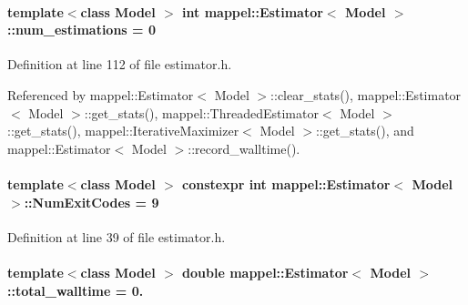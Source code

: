 \paragraph[{\texorpdfstring{num\+\_\+estimations}{num_estimations}}]{\setlength{\rightskip}{0pt plus 5cm}template$<$class Model $>$ int {\bf mappel\+::\+Estimator}$<$ Model $>$\+::num\+\_\+estimations = 0\hspace{0.3cm}{\ttfamily [protected]}}\hypertarget{classmappel_1_1Estimator_ab15b88435d6c50a68fac84465d950b12}{}\label{classmappel_1_1Estimator_ab15b88435d6c50a68fac84465d950b12}


Definition at line 112 of file estimator.\+h.



Referenced by mappel\+::\+Estimator$<$ Model $>$\+::clear\+\_\+stats(), mappel\+::\+Estimator$<$ Model $>$\+::get\+\_\+stats(), mappel\+::\+Threaded\+Estimator$<$ Model $>$\+::get\+\_\+stats(), mappel\+::\+Iterative\+Maximizer$<$ Model $>$\+::get\+\_\+stats(), and mappel\+::\+Estimator$<$ Model $>$\+::record\+\_\+walltime().

\paragraph[{\texorpdfstring{Num\+Exit\+Codes}{NumExitCodes}}]{\setlength{\rightskip}{0pt plus 5cm}template$<$class Model $>$ constexpr int {\bf mappel\+::\+Estimator}$<$ Model $>$\+::Num\+Exit\+Codes = 9\hspace{0.3cm}{\ttfamily [static]}}\hypertarget{classmappel_1_1Estimator_afcec036c4d78c12d427e0a733a00a48e}{}\label{classmappel_1_1Estimator_afcec036c4d78c12d427e0a733a00a48e}


Definition at line 39 of file estimator.\+h.

\paragraph[{\texorpdfstring{total\+\_\+walltime}{total_walltime}}]{\setlength{\rightskip}{0pt plus 5cm}template$<$class Model $>$ double {\bf mappel\+::\+Estimator}$<$ Model $>$\+::total\+\_\+walltime = 0.\hspace{0.3cm}{\ttfamily [protected]}}\hypertarget{classmappel_1_1Estimator_a5a408458a111c5222193871fa6bb6644}{}\label{classmappel_1_1Estimator_a5a408458a111c5222193871fa6bb6644}


